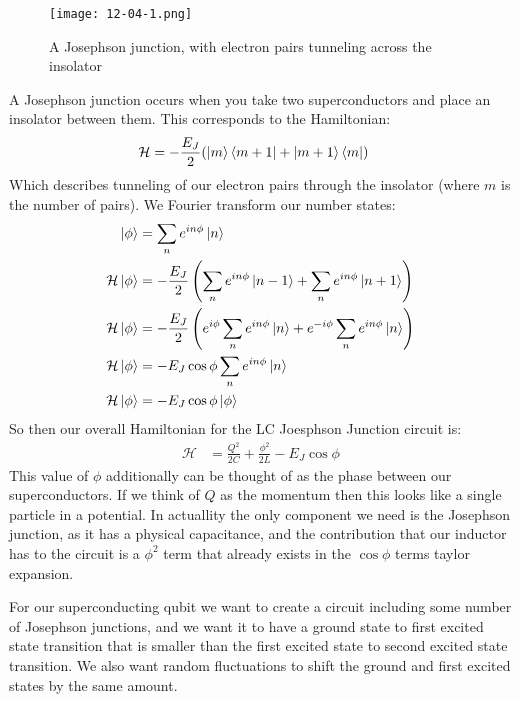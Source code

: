 \begin{figure*}[h]
	\centering
	\texttt{[image: 12-04-1.png]}
	\caption*{A Josephson junction, with electron pairs tunneling across the insolator}
\end{figure*}
A Josephson junction occurs when you take two superconductors and place an insolator between them. This corresponds to the Hamiltonian:
\begin{align*}
	\mathcal{H} &= -\frac{E_J}{2}(\ket{m}\bra{m+1} + \ket{m+1}\bra{m})
\end{align*}
Which describes tunneling of our electron pairs through the insolator (where $m$ is the number of pairs).
We Fourier transform our number states:
\begin{align*}
	\ket{\phi} &= \sum_n e^{in\phi} \ket{n} \\
	\mathcal{H}\ket{\phi} &= -\frac{E_J}{2}\left(\sum_n e^{in\phi}\ket{n-1} + \sum_ne^{in\phi}\ket{n+1}\right) \\
	\mathcal{H}\ket{\phi} &= -\frac{E_J}{2}\left(e^{i\phi}\sum_n e^{in\phi}\ket{n} + e^{-i\phi}\sum_ne^{in\phi}\ket{n}\right) \\
	\mathcal{H}\ket{\phi} &= -E_J\cos\phi\sum_n e^{in\phi}\ket{n} \\
	\mathcal{H}\ket{\phi} &= -E_J\cos\phi\ket{\phi}
\end{align*}
So then our overall Hamiltonian for the LC Joesphson Junction circuit is:
\begin{align*}
	\mathcal{H} &= \frac{Q^2}{2C} + \frac{\phi^2}{2L} - E_J\cos\phi
\end{align*}
This value of $\phi$ additionally can be thought of as the phase between our superconductors. If we think of $Q$ as the momentum then this looks like a single particle in a potential.
In actuallity the only component we need is the Josephson junction, as it has a physical capacitance, and the contribution that our inductor has to the circuit is a $\phi^2$ term that already exists in the $\cos\phi$ terms taylor expansion.

For our superconducting qubit we want to create a circuit including some number of Josephson junctions, and we want it to have a ground state to first excited state transition that is smaller than the first excited state to second excited state transition.
We also want random fluctuations to shift the ground and first excited states by the same amount.

